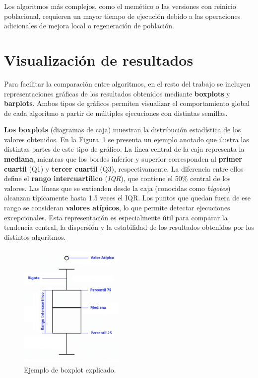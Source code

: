 Los algoritmos más complejos, como el memético o las versiones con reinicio poblacional,
requieren un mayor tiempo de ejecución debido a las operaciones adicionales de mejora local o regeneración de población.


\section{Visualización de resultados}\label{subsec:visualizacion-de-resultados}
Para facilitar la comparación entre algoritmos, en el resto del trabajo se incluyen representaciones gráficas de los
resultados obtenidos mediante \textbf{boxplots} y \textbf{barplots}.
Ambos tipos de gráficos permiten visualizar el comportamiento global de cada algoritmo a partir de múltiples ejecuciones con distintas semillas.

\textbf{Los boxplots} (diagramas de caja) muestran la distribución estadística de los valores obtenidos.
En la Figura~\ref{fig:boxplot-explicado} se presenta un ejemplo anotado que ilustra las distintas partes de este tipo de gráfico.
La línea central de la caja representa la \textbf{mediana},
mientras que los bordes inferior y superior corresponden al \textbf{primer cuartil} (Q1) y \textbf{tercer cuartil} (Q3), respectivamente.
La diferencia entre ellos define el \textbf{rango intercuartílico} (\textit{IQR}), que contiene el 50\% central de los valores.
Las líneas que se extienden desde la caja (conocidas como \textit{bigotes}) alcanzan típicamente hasta 1.5 veces el IQR.
Los puntos que quedan fuera de ese rango se consideran \textbf{valores atípicos}, lo que permite detectar ejecuciones excepcionales.
Esta representación es especialmente útil para comparar la tendencia central, la dispersión y la estabilidad de los resultados obtenidos por los distintos algoritmos.

\begin{figure}[H]
    \centering
    \includegraphics[width=0.45\textwidth]{imagenes/boxplot-explicado.png}
    \caption{Ejemplo de boxplot explicado.}
    \label{fig:boxplot-explicado}
\end{figure}

